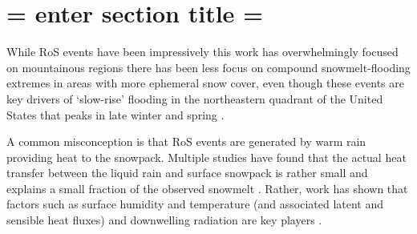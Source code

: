 \documentclass[draft]{agujournal2019}
\begin{document}
%
%
%
%


\section{= enter section title =}


While RoS events have been impressively this work has overwhelmingly focused on mountainous regions \citep{singh1997hydrological,mccabe2007rain,musselman2018projected} there has been less focus on compound snowmelt-flooding extremes in areas with more ephemeral snow cover, even though these events are key drivers of `slow-rise' flooding in the northeastern quadrant of the United States that peaks in late winter and spring \citep{ashley2008flood,villarini2010flood,dougherty2019climatology}.





A common misconception is that RoS events are generated by warm rain providing heat to the snowpack. Multiple studies have found that the actual heat transfer between the liquid rain and surface snowpack is rather small and explains a small fraction of the observed snowmelt \citep{moore1984controls}. Rather, work has shown that factors such as surface humidity and temperature (and associated latent and sensible heat fluxes) and downwelling radiation are key players \citep{wurzer2016influence,harpold2018humidity}.
\end{document}
